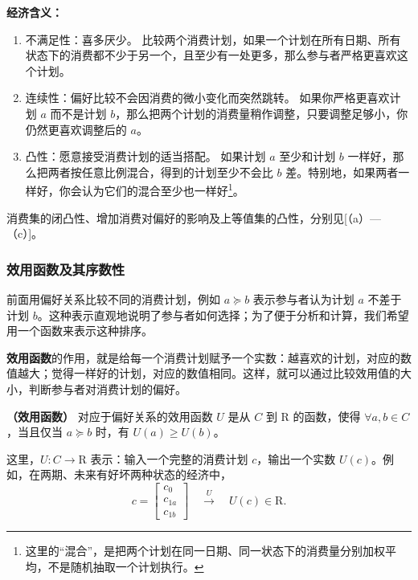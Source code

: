 \textbf{经济含义：}
\begin{enumerate}
    \item 不满足性：喜多厌少。 比较两个消费计划，如果一个计划在所有日期、所有状态下的消费都不少于另一个，且至少有一处更多，那么参与者严格更喜欢这个计划。

    \item 连续性：偏好比较不会因消费的微小变化而突然跳转。 如果你严格更喜欢计划 $a$ 而不是计划 $b$，那么把两个计划的消费量稍作调整，只要调整足够小，你仍然更喜欢调整后的 $a$。

    \item 凸性：愿意接受消费计划的适当搭配。 如果计划 $a$ 至少和计划 $b$ 一样好，那么把两者按任意比例混合，得到的计划至少不会比 $b$ 差。特别地，如果两者一样好，你会认为它们的混合至少也一样好\footnote{这里的“混合”，是把两个计划在同一日期、同一状态下的消费量分别加权平均，不是随机抽取一个计划执行。}。
\end{enumerate}

消费集的闭凸性、增加消费对偏好的影响及上等值集的凸性，分别见[（a）—（c）]。


\subsubsection{效用函数及其序数性}
前面用偏好关系比较不同的消费计划，例如 $a\succeq b$ 表示参与者认为计划 $a$ 不差于计划 $b$。这种表示直观地说明了参与者如何选择；为了便于分析和计算，我们希望用一个函数来表示这种排序。

\textbf{效用函数}的作用，就是给每一个消费计划赋予一个实数：越喜欢的计划，对应的数值越大；觉得一样好的计划，对应的数值相同。这样，就可以通过比较效用值的大小，判断参与者对消费计划的偏好。

\begin{tcolorbox}[knowledge]
        \textbf{（效用函数）} 对应于偏好关系的效用函数 $U$ 是从 $C$ 到 $\mathrm R$ 的函数，使得 $\forall a,b \in C$，当且仅当 $a\succeq b$ 时，有 $U(a) \ge U(b)$。
\end{tcolorbox}

这里，$U:C\to\mathrm R$ 表示：输入一个完整的消费计划 $c$，输出一个实数 $U(c)$。例如，在两期、未来有好坏两种状态的经济中，
\[
    c=\begin{bmatrix}c_0\\c_{1a}\\c_{1b}\end{bmatrix}
    \quad\xrightarrow{\ U\ }\quad U(c)\in\mathrm R.
\]

